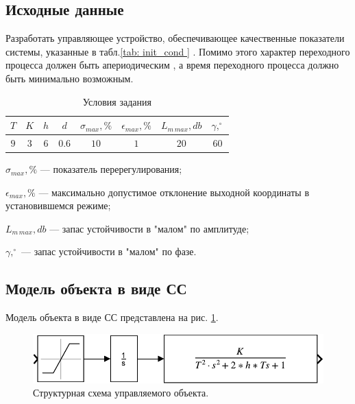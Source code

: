 \subsection{Исходные данные}
 Разработать управляющее устройство, обеспечивающее 
качественные показатели системы, указанные в 
табл.\ref{tab:
init_cond
}
.
Помимо этого характер переходного процесса должен быть 
апериодическим
, а время переходного процесса должно быть минимально возможным.

\begin{table}[!h] \centering
    \caption{
    Условия задания
    } \label{tab:
    init_cond
    }
    \begin{tabular}{|c|c|c|c|c|c|c|c|}
        \hline
        $T$ & $K$ & $h$ & $d$ & $\sigma_{max},\%$ & $\epsilon_{max},\%$ & $L_{m\,max},db$ & $\gamma,^{\circ}$ \\ \hline
         $9$ & $3$ & $6$ & $0.6$ & $10$ & $1$ & $20$ & $60$ \\ \hline
    \end{tabular}
\end{table}
$\sigma_{max},\%$ --- показатель перерегулирования;

$\epsilon_{max},\%$ --- максимально допустимое отклонение выходной координаты в установившемся режиме;

$L_{m\,max},db$ --- запас устойчивости в "малом" по амплитуде;

$\gamma,^{\circ}$ --- запас устойчивости в "малом" по фазе.
\subsection{Модель объекта в виде СС}
Модель объекта в виде СС представлена на рис. \ref{fig:sim_object}.
\begin{figure}[!h]\centering
\includegraphics[width=\linewidth]{images/sim_object}
\caption{Структурная схема управляемого объекта.}\label{fig:sim_object}
\end{figure}
